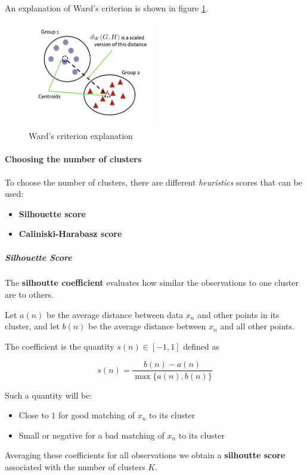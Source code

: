 An explanation of Ward's criterion is shown in figure \ref{fig:wardcriterion}.
\begin{figure}[h]
    \centering
    \includegraphics[width=0.5\textwidth]{./figures/chapter_7/wardcriterion.png}
    \caption{Ward's criterion explanation}
    \label{fig:wardcriterion}
\end{figure}

\paragraph*{Choosing the number of clusters}
To choose the number of clusters, there are different \textit{heuristics} scores that can be used:
\begin{itemize}
    \item \textbf{Silhouette score}
    \item \textbf{Caliniski-Harabasz score}
\end{itemize}

\subparagraph*{Silhouette Score}
The \textbf{silhoutte coefficient} evaluates how similar the observations to one cluster are to others.

Let $a(n)$ be the average distance between data $x_n$ and other points in its cluster, and let $b(n)$ be the average distance between $x_n$ and all other points.

The coefficient is the quantity $s(n)\in[-1,1]$ defined as

\[
    s(n)=\frac{b(n)-a(n)}{\max\{a(n),b(n)\}}
\]

Such a quantity will be:
\begin{itemize}
    \item Close to $1$ for good matching of $x_n$ to its cluster
    \item Small or negative for a bad matching of $x_n$ to its cluster
\end{itemize}

Averaging these coefficients for all observations we obtain a \textbf{silhoutte score} associated with the number of clusters $K$. 

